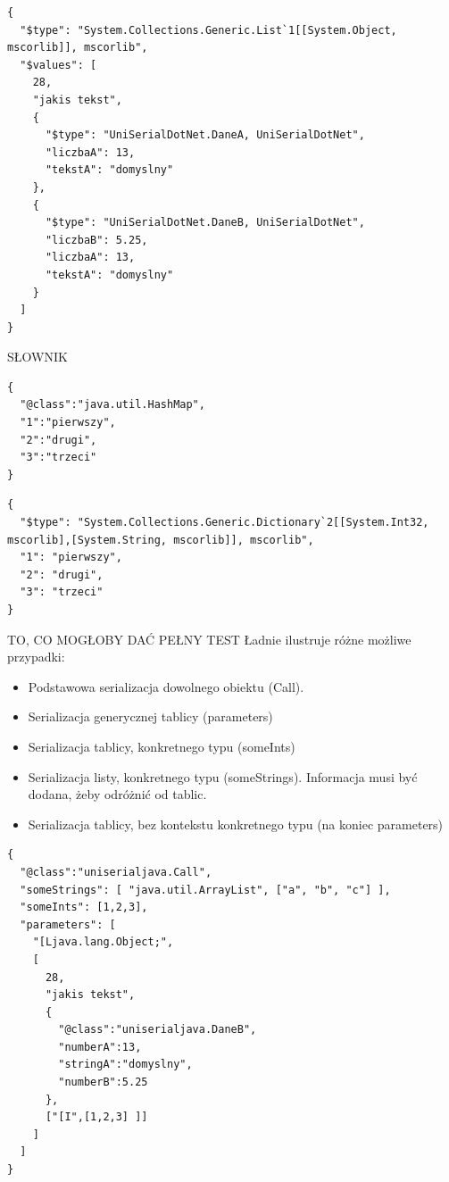 \begin{lstlisting}[float, frame=single, caption={JSON.NET daje. Lista}, label=kod:json-net-list-serilization]
{
  "$type": "System.Collections.Generic.List`1[[System.Object, mscorlib]], mscorlib",
  "$values": [
    28,
    "jakis tekst",
    {
      "$type": "UniSerialDotNet.DaneA, UniSerialDotNet",
      "liczbaA": 13,
      "tekstA": "domyslny"
    },
    {
      "$type": "UniSerialDotNet.DaneB, UniSerialDotNet",
      "liczbaB": 5.25,
      "liczbaA": 13,
      "tekstA": "domyslny"
    }
  ]
}
\end{lstlisting}

SŁOWNIK
\begin{lstlisting}[float, frame=single, caption={Jackson daje. Słownik}, label=kod:jackson-dict-serilization]
{
  "@class":"java.util.HashMap",
  "1":"pierwszy",
  "2":"drugi",
  "3":"trzeci"
}
\end{lstlisting}


\begin{lstlisting}[float, frame=single, caption={JSON.NET daje. Słownik}, label=kod:json-net-dict-serilization]
{
  "$type": "System.Collections.Generic.Dictionary`2[[System.Int32, mscorlib],[System.String, mscorlib]], mscorlib",
  "1": "pierwszy",
  "2": "drugi",
  "3": "trzeci"
}
\end{lstlisting}

TO, CO MOGŁOBY DAĆ PEŁNY TEST
Ładnie ilustruje różne możliwe przypadki:
\begin{itemize}
	\item Podstawowa serializacja dowolnego obiektu (Call).
	\item Serializacja generycznej tablicy (parameters)
	\item Serializacja tablicy, konkretnego typu (someInts)
	\item Serializacja listy, konkretnego typu (someStrings). Informacja musi być dodana, żeby odróżnić od tablic.
	\item Serializacja tablicy, bez kontekstu konkretnego typu (na koniec parameters)
\end{itemize}

\begin{lstlisting}[float, frame=single, caption={Jackson daje. Faktyczny test wywołania.}, label=kod:jackson-call-serilization]
{
  "@class":"uniserialjava.Call",
  "someStrings": [ "java.util.ArrayList", ["a", "b", "c"] ],
  "someInts": [1,2,3],
  "parameters": [
    "[Ljava.lang.Object;",
    [
      28,
      "jakis tekst",
      {
        "@class":"uniserialjava.DaneB",
        "numberA":13,
        "stringA":"domyslny",
        "numberB":5.25
      },
      ["[I",[1,2,3] ]]
    ]
  ]
}
\end{lstlisting}

